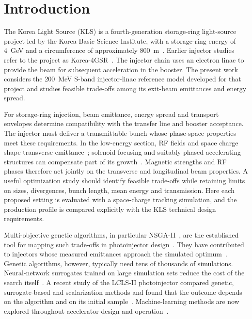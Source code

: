 \documentclass[aps,prab,reprint,superscriptaddress,amsmath,amssymb,floatfix]{revtex4-2}
\begin{document}
\maketitle
\makeatletter{}\makeatother

\section{Introduction}
\label{sec:introduction}

The Korea Light Source (KLS) is a fourth-generation storage-ring light-source project led by
the Korea Basic Science Institute, with a storage-ring energy of \SI{4}{\giga\electronvolt} and a
circumference of
approximately \SI{800}{\metre}~\cite{KLSProjectOverview}. Earlier injector studies refer to the project as
Korea-4GSR~\cite{Kim2024KLSMOGA,Kim2025KLSError}. The injector chain uses an electron linac to
provide the beam for subsequent acceleration in the booster. The present work considers the
\SI{200}{\mega\electronvolt} S-band injector-linac reference model developed for that project and
studies feasible
trade-offs among its exit-beam emittances and energy spread.

For storage-ring injection, beam emittance, energy spread and transport envelopes determine
compatibility with the transfer line and booster acceptance. The injector must deliver a
transmittable bunch whose phase-space properties meet these requirements. In the
low-energy section, RF fields and space charge shape transverse emittance~\cite{Kim1989};
solenoid focusing and suitably phased accelerating structures can compensate part of its
growth~\cite{Carlsten1989,Serafini1997}. Magnetic strengths and RF phases therefore act jointly
on the transverse and longitudinal beam properties. A useful optimization study should identify
feasible trade-offs while retaining limits on sizes, divergences, bunch length, mean energy and
transmission. Here each proposed setting is evaluated with a space-charge tracking simulation,
and the production profile is compared explicitly with the KLS technical design requirements.

Multi-objective genetic algorithms, in particular NSGA-II~\cite{Deb2002}, are the established tool
for mapping such trade-offs in photoinjector design~\cite{Bazarov2005,Hofler2013}. They have
contributed to injectors whose measured emittances approach the simulated
optimum~\cite{Gulliford2013}. Genetic algorithms, however, typically need tens of thousands of
simulations. Neural-network surrogates trained on large simulation sets reduce the cost of the
search itself~\cite{Edelen2020}. A recent study of the LCLS-II photoinjector compared genetic,
surrogate-based and scalarization methods and found that the outcome depends on the algorithm and
on its initial sample~\cite{Neveu2022}. Machine-learning methods are now explored throughout
accelerator design and operation~\cite{Edelen2018}.
\end{document}
